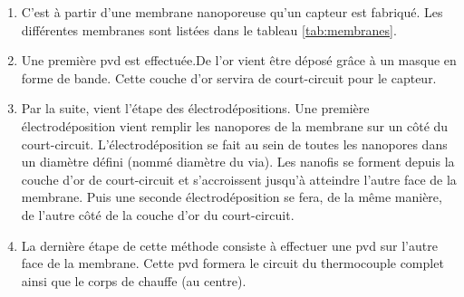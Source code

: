 \begin{itemize}
          \noindent \begin{enumerate}[label=(\alph*), wide, labelwidth=!, labelindent = 0pt]
              \item C'est à partir d'une membrane nanoporeuse qu'un capteur est fabriqué. Les différentes membranes sont listées dans le tableau
                    \ref{tab:membranes}. \\
              \item Une première \gls{pvd} est effectuée.De l'or vient être déposé grâce à un masque en forme de bande.
                    Cette couche d'or servira de court-circuit pour le capteur. \\
              \item Par la suite, vient l'étape des électrodépositions. Une première électrodéposition vient remplir les nanopores de la membrane
                    sur un côté du court-circuit. L'électrodéposition se fait au sein de toutes les nanopores dans un diamètre défini (nommé diamètre du via). 
                    Les nanofis se forment depuis la couche d'or de court-circuit et s'accroissent jusqu'à atteindre l'autre face de la membrane. 
                    Puis une seconde électrodéposition se fera, de la même manière, de l'autre côté de la couche d'or du court-circuit. \\
              \item La dernière étape de cette méthode consiste à effectuer une \gls{pvd} sur l'autre face de la membrane. Cette \gls{pvd} formera
                    le circuit du thermocouple complet ainsi que le corps de chauffe (au centre). 
          \end{enumerate}
          

\end{itemize}
